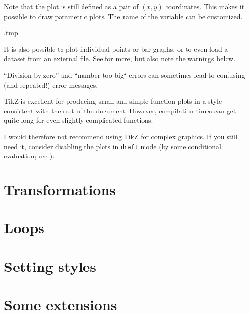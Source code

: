 Note that the plot is still defined as a pair of $(x,y)$ coordinates.
This makes it possible to draw parametric plots.
The name of the variable can be customized.
%
\begin{VerbatimOut}{\jobname.tmp}
\centering
{}
\end{VerbatimOut}
\ShowExampleBelow[2]

It is also possible to plot individual points or bar graphs,
or to even load a dataset from an external file.
See \cite[Section~22]{tikz} for more,
but also note the warnings below.

\begin{warning}
``Division by zero'' and ``number too big`` errors
can sometimes lead to confusing (and repeated!) error messages.
\end{warning}

\begin{practices}
TikZ is excellent for producing small and simple function plots
in a style consistent with the rest of the document.
However, compilation times can get quite long for even slightly complicated functions.

I would therefore not recommend using TikZ for complex graphics.
If you still need it, consider disabling the plots in \verb|draft| mode
(by some conditional evaluation; see ).
\end{practices}



%
%
\section{Transformations}



%
%
\section{Loops}


%
%
\section{Setting styles}\label{sec:tikz styles}


%
%
\section{Some extensions}

